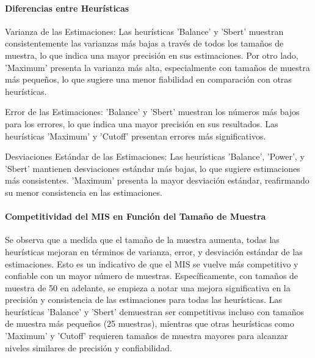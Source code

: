 \documentclass{article}
\begin{document}
\begin{table}[H]
\centering
\label{table:heuristic_analysis}
\caption{Análisis de los resultados por heurística}
\end{table}


\paragraph{Diferencias entre Heurísticas}
Varianza de las Estimaciones: Las heurísticas 'Balance' y 'Sbert' muestran consistentemente las varianzas más bajas a través de todos los tamaños de muestra, lo que indica una mayor precisión en sus estimaciones.
Por otro lado, 'Maximum' presenta la varianza más alta, especialmente con tamaños de muestra más pequeños, lo que sugiere una menor fiabilidad en comparación con otras heurísticas.

Error de las Estimaciones: 'Balance' y 'Sbert' muestran los números más bajos para los errores, lo que indica una mayor precisión en sus resultados.
Las heurísticas 'Maximum' y 'Cutoff' presentan errores más significativos.

Desviaciones Estándar de las Estimaciones: Las heurísticas 'Balance', 'Power', y 'Sbert' mantienen desviaciones estándar más bajas, lo que sugiere estimaciones más consistentes.
'Maximum' presenta la mayor desviación estándar, reafirmando su menor consistencia en las estimaciones.

\paragraph{Competitividad del MIS en Función del Tamaño de Muestra}
Se observa que a medida que el tamaño de la muestra aumenta, todas las heurísticas mejoran en términos de varianza, error, y desviación estándar de las estimaciones. Esto es un indicativo de que el MIS se vuelve más competitivo y confiable con un mayor número de muestras.
Específicamente, con tamaños de muestra de 50 en adelante, se empieza a notar una mejora significativa en la precisión y consistencia de las estimaciones para todas las heurísticas.
Las heurísticas 'Balance' y 'Sbert' demuestran ser competitivas incluso con tamaños de muestra más pequeños (25 muestras), mientras que otras heurísticas como 'Maximum' y 'Cutoff' requieren tamaños de muestra mayores para alcanzar niveles similares de precisión y confiabilidad.
\end{document}

